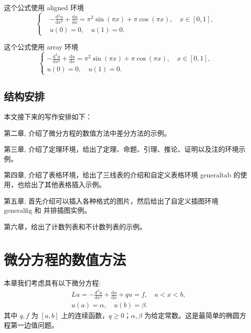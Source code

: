 \documentclass{shnuthesis}
\begin{document}
这个公式使用 aligned 环境
\begin{equation}\label{eq:equation1}
\left\{\begin{aligned}
  &-\frac{\mathrm{d}^{2} u}{\mathrm{d} x^{2}}+\frac{\mathrm{d} u}{\mathrm{d} x}=\pi^{2} \sin (\pi x)+\pi \cos (\pi x),\quad x \in [0,1], \\
  &u(0)=0,\quad u(1)=0.
\end{aligned} \right.
\end{equation}

这个公式使用 array 环境
\begin{equation}\label{eq:equation2}
\left\{\begin{array}{l}
\displaystyle
-\frac{\mathrm{d}^{2} u}{\mathrm{d} x^{2}}+\frac{\mathrm{d} u}{\mathrm{d} x}=\pi^{2} \sin (\pi x)+\pi \cos (\pi x),\quad x \in [0,1], \\[6pt]
u(0)=0,\quad u(1)=0.
\end{array} \right.
\end{equation}
\section{结构安排}

本文接下来的写作安排如下：

第二章,  介绍了微分方程的数值方法中差分方法的示例。

第三章, 介绍了定理环境，给出了定理、命题、引理、推论、证明以及注的环境示例。

第四章, 介绍了表格环境，给出了三线表的介绍和自定义表格环境 generaltab 的使用，也给出了其他表格插入示例。

第五章, 首先介绍可以插入各种格式的图片，然后给出了自定义插图环境 generalfig 和 并排插图实例。

第六章，给出了计数列表和不计数列表的示例。



\chapter{微分方程的数值方法}

本章我们考虑具有以下微分方程:
\begin{equation}\label{Equ11}
\begin{aligned}
& L u=-\frac{\mathrm{d}^{2} u}{\mathrm{d} x^{2}}+\frac{\mathrm{d} u}{\mathrm{d} x}+q u=f, \quad a < x < b, \\
&u(a)=\alpha, \quad u(b)=\beta.
\end{aligned}
\end{equation}
其中 $q, f$ 为 $[a,b]$ 上的连续函数，$q \geqslant 0$；$\alpha, \beta$ 为给定常数。这是最简单的椭圆方程第一边值问题。
\end{document}
